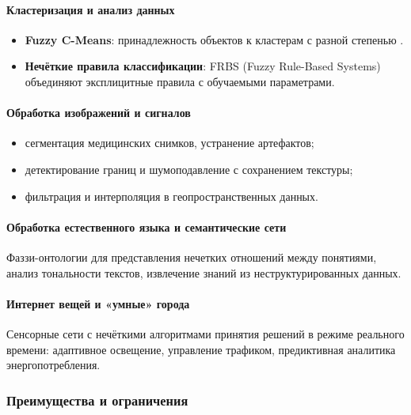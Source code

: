 \paragraph{Кластеризация и анализ данных}
\begin{itemize}
  \item \textbf{Fuzzy C-Means}: принадлежность объектов к кластерам с разной степенью \cite{Bezdek1981}.
  \item \textbf{Нечёткие правила классификации}: FRBS (Fuzzy Rule-Based Systems) объединяют эксплицитные правила с обучаемыми параметрами.
\end{itemize}

\paragraph{Обработка изображений и сигналов}
\begin{itemize}
  \item сегментация медицинских снимков, устранение артефактов;
  \item детектирование границ и шумоподавление с сохранением текстуры;
  \item фильтрация и интерполяция в геопространственных данных.
\end{itemize}

\paragraph{Обработка естественного языка и семантические сети}

Фаззи-онтологии для представления нечетких отношений между понятиями, анализ тональности текстов, извлечение знаний из неструктурированных данных.

\paragraph{Интернет вещей и «умные» города}

Сенсорные сети с нечёткими алгоритмами принятия решений в режиме реального времени: адаптивное освещение, управление трафиком, предиктивная аналитика энергопотребления.

\subsubsection{Преимущества и ограничения}
\label{subsec:pros_cons}

